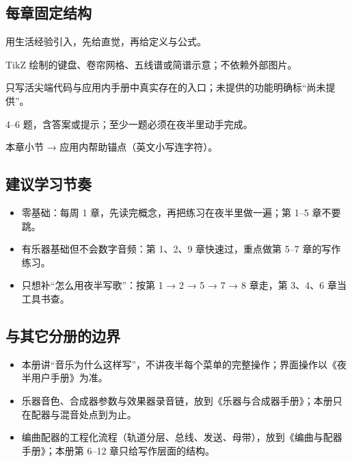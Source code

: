 \subsection*{每章固定结构}

\begin{description}[leftmargin=2em,style=nextline]
  \item[概念] 用生活经验引入，先给直觉，再给定义与公式。
  \item[谱例/图示] TikZ 绘制的键盘、卷帘网格、五线谱或简谱示意；不依赖外部图片。
  \item[在夜半里怎么做] 只写活尖端代码与应用内手册中真实存在的入口；未提供的功能明确标“尚未提供”。
  \item[练习] 4–6 题，含答案或提示；至少一题必须在夜半里动手完成。
  \item[帮助主题映射] 本章小节 → 应用内帮助锚点（英文小写连字符）。
\end{description}

\subsection*{建议学习节奏}

\begin{itemize}
  \item 零基础：每周 1 章，先读完概念，再把练习在夜半里做一遍；第 1–5 章不要跳。
  \item 有乐器基础但不会数字音频：第 1、2、9 章快速过，重点做第 5–7 章的写作练习。
  \item 只想补“怎么用夜半写歌”：按第 1 → 2 → 5 → 7 → 8 章走，第 3、4、6 章当工具书查。
\end{itemize}

\subsection*{与其它分册的边界}

\begin{itemize}
  \item 本册讲“音乐为什么这样写”，不讲夜半每个菜单的完整操作；界面操作以《夜半用户手册》为准。
  \item 乐器音色、合成器参数与效果器录音链，放到《乐器与合成器手册》；本册只在配器与混音处点到为止。
  \item 编曲配器的工程化流程（轨道分层、总线、发送、母带），放到《编曲与配器手册》；本册第 6–12 章只给写作层面的结构。
\end{itemize}
